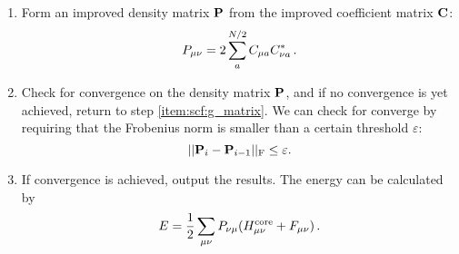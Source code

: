 \documentclass[12pt]{article}
\begin{document}
\begin{enumerate}
        \item Form an improved density matrix $\vb{P}$ from the improved coefficient matrix $\vb{C}$:
        \begin{equation}
            P_{\mu \nu} = 2 \sum_a^{N/2} C_{\mu a} C^*_{\nu a} \thinspace .
        \end{equation}

        \item Check for convergence on the density matrix $\vb{P}$, and if no convergence is yet achieved, return to step \ref{item:scf:g_matrix}. We can check for converge by requiring that the Frobenius norm is smaller than a certain threshold $\varepsilon$:
        \begin{equation}
            ||\vb{P}_i - \vb{P}_{i-1}||_\text{F} \leq \varepsilon .
        \end{equation}

        \item If convergence is achieved, output the results. The energy can be calculated by
        \begin{equation}
            E = \frac{1}{2} \sum_{\mu \nu} P_{\nu \mu} (H^\text{core}_{\mu \nu} + F_{\mu \nu}) \thinspace .
        \end{equation}
    \end{enumerate}






\end{document}

